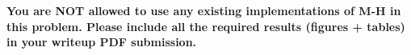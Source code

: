 \documentclass{article}
\begin{document}
\textbf{You are NOT allowed to use any existing implementations of M-H in this problem. Please include all the required results (figures + tables) in your writeup PDF submission.}






















\newpage


\end{document}
